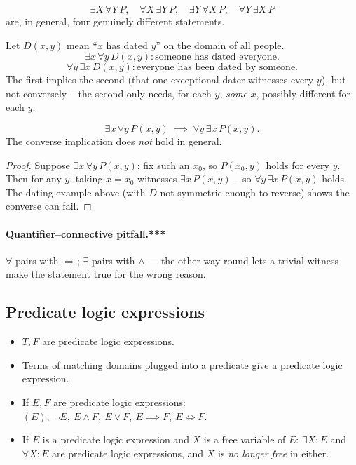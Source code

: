 \documentclass[11pt]{article}
\begin{document}
\begin{note}
\[
\exists X\,\forall Y\, P, \quad \forall X\,\exists Y\, P, \quad \exists Y\,\forall X\, P, \quad \forall Y\,\exists X\, P
\]
are, in general, four genuinely different statements.
\end{note}

\bigskip
\begin{example}
Let $D(x,y)$ mean ``$x$ has dated $y$'' on the domain of all people.
\[
\exists x\,\forall y\, D(x,y): \text{someone has dated everyone}.
\]
\[
\forall y\,\exists x\, D(x,y): \text{everyone has been dated by someone.}
\]
The first implies the second (that one exceptional dater witnesses every $y$), but not conversely -- the second only needs, for each $y$, \emph{some} $x$, possibly different for each $y$.
\end{example}

\begin{theorem}
\[
\exists x\,\forall y\, P(x,y) \ \implies\ \forall y\,\exists x\, P(x,y).
\]
The converse implication does \emph{not} hold in general.
\end{theorem}
\begin{proof}
Suppose $\exists x\,\forall y\,P(x,y)$: fix such an $x_0$, so $P(x_0,y)$ holds for every $y$. Then for any $y$, taking $x=x_0$ witnesses $\exists x\,P(x,y)$ -- so $\forall y\,\exists x\,P(x,y)$ holds. The dating example above (with $D$ not symmetric enough to reverse) shows the converse can fail.
\end{proof}

\paragraph{Quantifier--connective pitfall.***} $\forall$ pairs with
$\Rightarrow$; $\exists$ pairs with $\wedge$ --- the other way round
lets a trivial witness make the statement true for the wrong reason.

\subsection{Predicate logic expressions}
\label{sec:5-11}

\begin{definition}
\begin{itemize}
    \item $T,F$ are predicate logic expressions.
    \item Terms of matching domains plugged into a predicate give a predicate logic expression.
    \item If $E,F$ are predicate logic expressions: $(E),\ \neg E,\ E\wedge F,\ E\vee F,\ E\implies F,\ E\iff F$.
    \item If $E$ is a predicate logic expression and $X$ is a free variable of $E$: $\exists X: E$ and $\forall X: E$ are predicate logic expressions, and $X$ is \emph{no longer free} in either.
\end{itemize}
\end{definition}
\end{document}
